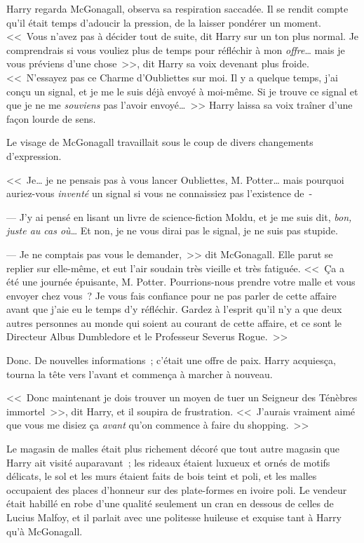 Harry regarda McGonagall, observa sa respiration saccadée. Il se rendit compte qu'il était temps d'adoucir la pression, de la laisser pondérer un moment. <<~Vous n'avez pas à décider tout de suite, dit Harry sur un ton plus normal. Je comprendrais si vous vouliez plus de temps pour réfléchir à mon \emph{offre}… mais je vous préviens d'une chose~>>, dit Harry sa voix devenant plus froide. <<~N'essayez pas ce Charme d'Oubliettes sur moi. Il y a quelque temps, j'ai conçu un signal, et je me le suis déjà envoyé à moi-même. Si je trouve ce signal et que je ne me \emph{souviens} pas l'avoir envoyé…~>> Harry laissa sa voix traîner d'une façon lourde de sens.

Le visage de McGonagall travaillait sous le coup de divers changements d'expression.

<<~Je… je ne pensais pas à vous lancer Oubliettes, M. Potter… mais pourquoi auriez-vous \emph{inventé} un signal si vous ne connaissiez pas l'existence de~-

--- J'y ai pensé en lisant un livre de science-fiction Moldu, et je me suis dit, \emph{bon, juste au cas où}… Et non, je ne vous dirai pas le signal, je ne suis pas stupide.

--- Je ne comptais pas vous le demander,~>> dit McGonagall. Elle parut se replier sur elle-même, et eut l'air soudain très vieille et très fatiguée. <<~Ça a été une journée épuisante, M. Potter. Pourrions-nous prendre votre malle et vous envoyer chez vous~? Je vous fais confiance pour ne pas parler de cette affaire avant que j'aie eu le temps d'y réfléchir. Gardez à l'esprit qu'il n'y a que deux autres personnes au monde qui soient au courant de cette affaire, et ce sont le Directeur Albus Dumbledore et le Professeur Severus Rogue.~>>

Donc. De nouvelles informations~; c'était une offre de paix. Harry acquiesça, tourna la tête vers l'avant et commença à marcher à nouveau.

<<~Donc maintenant je dois trouver un moyen de tuer un Seigneur des Ténèbres immortel~>>, dit Harry, et il soupira de frustration. <<~J'aurais vraiment aimé que vous me disiez ça \emph{avant} qu'on commence à faire du shopping.~>>

\later

Le magasin de malles était plus richement décoré que tout autre magasin que Harry ait visité auparavant~; les rideaux étaient luxueux et ornés de motifs délicats, le sol et les murs étaient faits de bois teint et poli, et les malles occupaient des places d'honneur sur des plate-formes en ivoire poli. Le vendeur était habillé en robe d'une qualité seulement un cran en dessous de celles de Lucius Malfoy, et il parlait avec une politesse huileuse et exquise tant à Harry qu'à McGonagall.

